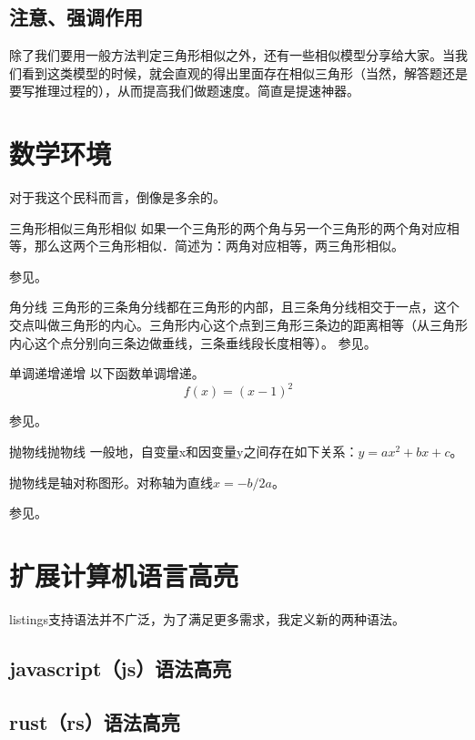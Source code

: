 \documentclass{morelull}
\begin{document}
\subsection{注意、强调作用}
\begin{注意}
除了我们要用一般方法判定三角形相似之外，还有一些相似模型分享给大家。当我们看到这类模型的时候，就会直观的得出里面存在相似三角形（当然，解答题还是要写推理过程的），从而提高我们做题速度。简直是提速神器。
\end{注意}

\section{数学环境}
对于我这个民科而言，倒像是多余的。

\begin{定理}{三角形相似}{三角形相似}
    如果一个三角形的两个角与另一个三角形的两个角对应相等，那么这两个三角形相似．简述为：两角对应相等，两三角形相似。

    参见。
\end{定理}

\begin{结论}{}{角分线}
    三角形的三条角分线都在三角形的内部，且三条角分线相交于一点，这个交点叫做三角形的内心。三角形内心这个点到三角形三条边的距离相等（从三角形内心这个点分别向三条边做垂线，三条垂线段长度相等）。
    参见。
\end{结论}

\begin{命题}{单调递增}{递增}
以下函数单调增递。
\[
    f(x) = (x - 1) ^ 2
\]

参见。
\end{命题}

\begin{定义}{抛物线}{抛物线}
    一般地，自变量x和因变量y之间存在如下关系：$y=ax^2+bx+c$。

    抛物线是轴对称图形。对称轴为直线$x=-b/2a$。

    参见。
\end{定义}

\section{扩展计算机语言高亮}
listings支持语法并不广泛，为了满足更多需求，我定义新的两种语法。

\subsection{javascript（js）语法高亮}


\subsection{rust（rs）语法高亮}

\end{document}
